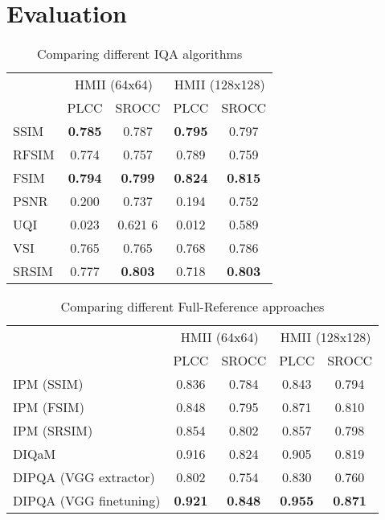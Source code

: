 \chapter{Evaluation}
\begin{table}[ht]
  \centering
  \begin{tabular}{|l|cc|cc|}
    \hline
    \multirow{2}{*}{} & \multicolumn{2}{c|}{ HMII (64x64) }      & \multicolumn{2}{c|}{ HMII (128x128) }    \\ \cline{2-5} 
    & PLCC           & SROCC           & PLCC           & SROCC           \\ \hline
    SSIM\cite{Wang2004}             & \textbf{0.785} & 0.787          & \textbf{0.795} & 0.797          \\
    RFSIM\cite{Zhang2010}             & 0.774          & 0.757          & 0.789          & 0.759          \\
    FSIM\cite{Zhang2011}              & \textbf{0.794} & \textbf{0.799} & \textbf{0.824} & \textbf{0.815} \\
    PSNR              & 0.200          & 0.737          & 0.194          & 0.752          \\
    UQI               & 0.023          & 0.621     6     & 0.012          & 0.589          \\
    VSI               & 0.765          & 0.765          & 0.768          & 0.786          \\
    SRSIM             & 0.777          & \textbf{0.803} & 0.718          & \textbf{0.803} \\ \hline
  \end{tabular}
  \caption{Comparing different IQA algorithms}
  \label{tab:algos}
\end{table}

\begin{table}[ht]
  \centering
  \begin{tabular}{|l|cc|cc|}
    \hline
    \multirow{2}{*}{} & \multicolumn{2}{c|}{ HMII (64x64) } & \multicolumn{2}{c|}{ HMII (128x128) } \\ \cline{2-5} 
    & PLCC              & SROCC            & PLCC               & SROCC             \\ \hline
    IPM (SSIM)             & 0.836             & 0.784            & 0.843              & 0.794             \\
    IPM (FSIM)             & 0.848             & 0.795            & 0.871              & 0.810             \\
    IPM (SRSIM)            & 0.854             & 0.802            & 0.857              & 0.798             \\
    DIQaM                  & 0.916             & 0.824            & 0.905              & 0.819             \\
    DIPQA (VGG extractor)  & 0.802             & 0.754            & 0.830              & 0.760             \\
    DIPQA (VGG finetuning) & \textbf{0.921}    & \textbf{0.848}   & \textbf{0.955}     & \textbf{0.871}    \\ \hline
  \end{tabular}
  \caption{Comparing different Full-Reference approaches}
  \label{tab:approachs}
\end{table}